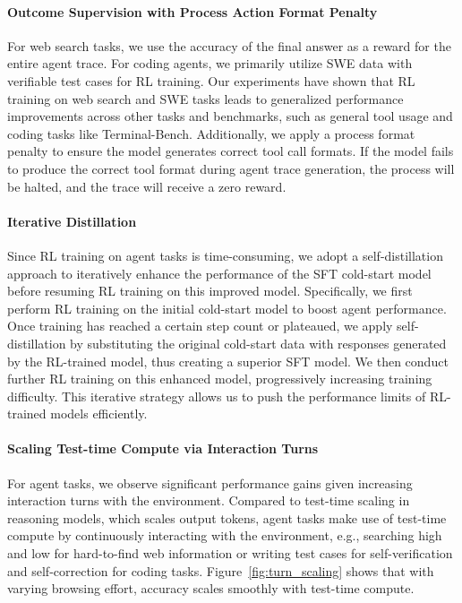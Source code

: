 \paragraph{Outcome Supervision with Process Action Format Penalty} For web search tasks, we use the accuracy of the final answer as a reward for the entire agent trace. For coding agents, we primarily utilize SWE data with verifiable test cases for RL training. Our experiments have shown that RL training on web search and SWE tasks leads to generalized performance improvements across other tasks and benchmarks, such as general tool usage and coding tasks like Terminal-Bench. Additionally, we apply a process format penalty to ensure the model generates correct tool call formats. If the model fails to produce the correct tool format during agent trace generation, the process will be halted, and the trace will receive a zero reward.

\paragraph{Iterative Distillation} Since RL training on agent tasks is time-consuming, we adopt a self-distillation approach to iteratively enhance the performance of the SFT cold-start model before resuming RL training on this improved model. Specifically, we first perform RL training on the initial cold-start model to boost agent performance. Once training has reached a certain step count or plateaued, we apply self-distillation by substituting the original cold-start data with responses generated by the RL-trained model, thus creating a superior SFT model. We then conduct further RL training on this enhanced model, progressively increasing training difficulty. This iterative strategy allows us to push the performance limits of RL-trained models efficiently.

\paragraph{Scaling Test-time Compute via Interaction Turns} For agent tasks, we observe significant performance gains given increasing interaction turns with the environment. Compared to test-time scaling in reasoning models, which scales output tokens, agent tasks make use of test-time compute by continuously interacting with the environment, e.g., searching high and low for hard-to-find web information or writing test cases for self-verification and self-correction for coding tasks. 
Figure~\ref{fig:turn_scaling} shows that with varying browsing effort,  accuracy scales smoothly with test-time compute.

